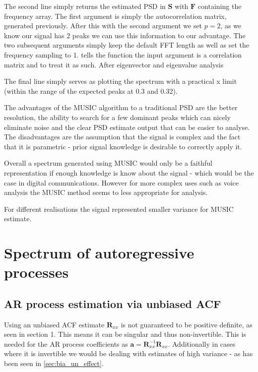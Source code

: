 \documentclass[10pt,twoside,a4paper]{report}
\begin{document}
The second line  simply returns the estimated PSD in $\mathbf{S}$ with $\mathbf{F}$ containing the frequency array. The first argument is simply the autocorrelation matrix, generated previously. After this with the second argument we set $p=2$, as we know our signal has 2 peaks we can use this information to our advantage. The two subsequent arguments simply keep the default FFT length as well as set the frequency sampling to 1.  tells the function the input argument is a correlation matrix and to treat it as such. After eigenvector and eigenvalue analysis 

The final line  simply serves as plotting the spectrum with a practical x limit (within the range of the expected peaks at 0.3 and 0.32).

The advantages of the MUSIC algorithm to a traditional PSD are the better resolution, the ability to search for a few dominant peaks which can nicely eliminate noise and the clear PSD estimate output that can be easier to analyse. The disadvantages are the assumption that the signal is complex and the fact that it is parametric - prior signal knowledge is desirable to correctly apply it.

Overall a spectrum generated using MUSIC would only be a faithful representation if enough knowledge is know about the signal - which would be the case in digital communications. However for more complex uses such as voice analysis the MUSIC method seems to less appropriate for analysis.


For different realisations the signal represented smaller variance for MUSIC estimate.


\section{Spectrum of autoregressive processes}

\subsection{AR process estimation via unbiased ACF}
Using an unbiased ACF estimate $\mathbf{R}_{xx}$ is not guaranteed to be positive definite, as seen in section 1. This means it can be singular and thus non-invertible. This is needed for the AR process coefficients as $\mathbf{a} = \mathbf{R}_{xx}^{-1} \mathbf{R}_{xx}$. Additionally in cases where it is invertible we would be dealing with estimates of high variance - as has been seen in \ref{sec:bia_un_effect}.
\end{document}
